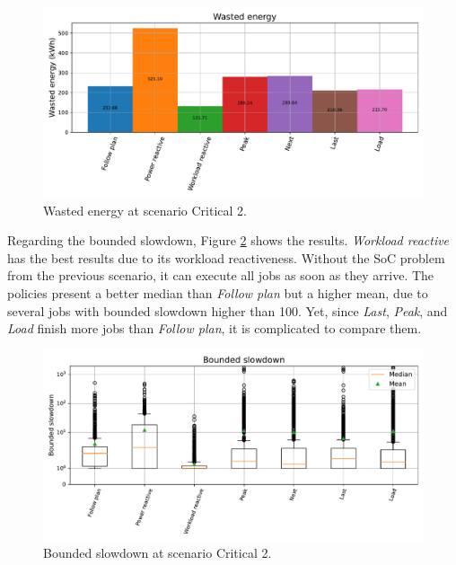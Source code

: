 \begin{figure}[!htb]
    \centering
    \includegraphics[scale=0.55]{Images/Compensations/energy_critical_2.pdf}
    \caption{Wasted energy at scenario Critical 2.}
    \label{fig:energy_critical_2}
\end{figure}

Regarding the bounded slowdown, Figure \ref{fig:slowdown_critical_2} shows the results. \emph{Workload reactive} has the best results due to its workload reactiveness. Without the SoC problem from the previous scenario, it can execute all jobs as soon as they arrive. The policies present a better median than \emph{Follow plan} but a higher mean, due to several jobs with bounded slowdown higher than 100. Yet, since \emph{Last}, \emph{Peak}, and \emph{Load} finish more jobs than \emph{Follow plan}, it is complicated to compare them.

\begin{figure}[!htb]
    \centering
    \includegraphics[scale=0.55]{Images/Compensations/slowdown_critical_2.pdf}
    \caption{Bounded slowdown at scenario Critical 2.}
    \label{fig:slowdown_critical_2}
\end{figure}

\clearpage


